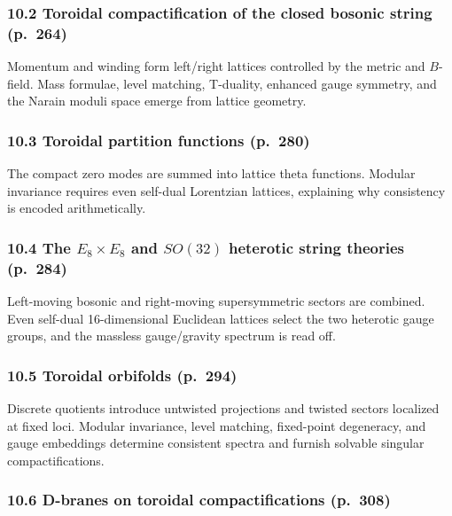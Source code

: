 \documentclass[
  10pt,
  a4paper,
  openany]{book}
\begin{document}
\subsubsection{10.2 Toroidal compactification of the closed bosonic
string
(p.~264)}\label{toroidal-compactification-of-the-closed-bosonic-string-p.-264}

Momentum and winding form left/right lattices controlled by the metric
and \(B\)-field. Mass formulae, level matching, T-duality, enhanced
gauge symmetry, and the Narain moduli space emerge from lattice
geometry.

\subsubsection{10.3 Toroidal partition functions
(p.~280)}\label{toroidal-partition-functions-p.-280}

The compact zero modes are summed into lattice theta functions. Modular
invariance requires even self-dual Lorentzian lattices, explaining why
consistency is encoded arithmetically.

\subsubsection{\texorpdfstring{10.4 The \(E_8\times E_8\) and \(SO(32)\)
heterotic string theories
(p.~284)}{10.4 The E\_8\textbackslash times E\_8 and SO(32) heterotic string theories (p.~284)}}\label{the-e_8times-e_8-and-so32-heterotic-string-theories-p.-284}

Left-moving bosonic and right-moving supersymmetric sectors are
combined. Even self-dual 16-dimensional Euclidean lattices select the
two heterotic gauge groups, and the massless gauge/gravity spectrum is
read off.

\subsubsection{10.5 Toroidal orbifolds
(p.~294)}\label{toroidal-orbifolds-p.-294}

Discrete quotients introduce untwisted projections and twisted sectors
localized at fixed loci. Modular invariance, level matching, fixed-point
degeneracy, and gauge embeddings determine consistent spectra and
furnish solvable singular compactifications.

\subsubsection{10.6 D-branes on toroidal compactifications
(p.~308)}\label{d-branes-on-toroidal-compactifications-p.-308}
\end{document}
